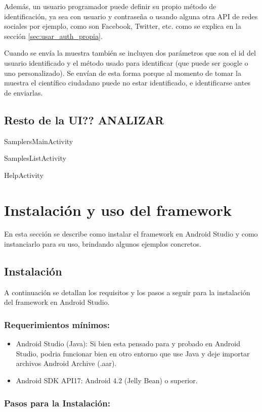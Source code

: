 Además, un usuario programador puede definir su propio método de identificación, ya sea con usuario y contraseña o usando alguna otra API de redes sociales por ejemplo, como son Facebook, Twitter, etc. como se explica en la sección \ref{sec:usar_auth_propia}.

Cuando se envía la muestra también se incluyen dos parámetros que son el id del usuario identificado y el método usado para identificar (que puede ser google o uno personalizado). Se envían de esta forma porque al momento de tomar la muestra el científico ciudadano puede no estar identificado, e identificarse antes de enviarlas.

\subsection{Resto de la UI?? ANALIZAR}

SamplersMainActivity

SamplesListActivity

HelpActivity


\section{Instalación y uso del framework} \label{sec:instalacion_uso}
En esta sección se describe como instalar el framework en Android Studio y como instanciarlo para su uso, brindando algunos ejemplos concretos.

\subsection{Instalación}
A continuación se detallan los requisitos y los pasos a seguir para la instalación del framework en Android Studio.

\subsubsection{Requerimientos mínimos:}

\begin{itemize}
\item Android Studio (Java): Si bien esta pensado para y probado en Android Studio, podria funcionar bien en otro entorno que use Java y deje importar archivos Android Archive (.aar).
\item Android SDK API17: Android 4.2 (Jelly Bean) o superior.
\end{itemize}

\subsubsection{Pasos para la Instalación:}

